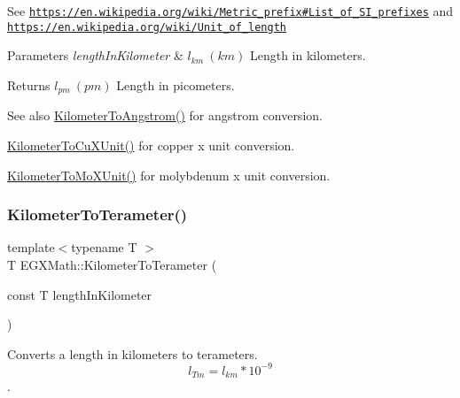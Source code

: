See \href{https://en.wikipedia.org/wiki/Metric_prefix#List_of_SI_prefixes}{\tt https\+://en.\+wikipedia.\+org/wiki/\+Metric\+\_\+prefix\#\+List\+\_\+of\+\_\+\+S\+I\+\_\+prefixes} and \href{https://en.wikipedia.org/wiki/Unit_of_length}{\tt https\+://en.\+wikipedia.\+org/wiki/\+Unit\+\_\+of\+\_\+length} 
\begin{DoxyParams}{Parameters}
{\em length\+In\+Kilometer} & $ l_{km}\ (km)$ Length in kilometers. \\
\hline
\end{DoxyParams}
\begin{DoxyReturn}{Returns}
$ l_{pm}\ (pm)$ Length in picometers. 
\end{DoxyReturn}
\begin{DoxySeeAlso}{See also}
\mbox{\hyperlink{group___e_g_x_math-_conversions-_length_conversions-_kilometer-_non-_s_i_ga415a412a1b03916d6071a206a3318035}{Kilometer\+To\+Angstrom()}} for angstrom conversion. 

\mbox{\hyperlink{group___e_g_x_math-_conversions-_length_conversions-_kilometer-_non-_s_i_ga0614eb6a9e8bf1a9ba6cf51121f22083}{Kilometer\+To\+Cu\+X\+Unit()}} for copper x unit conversion. 

\mbox{\hyperlink{group___e_g_x_math-_conversions-_length_conversions-_kilometer-_non-_s_i_ga547782594ebd0cc3e565f6d32f9528df}{Kilometer\+To\+Mo\+X\+Unit()}} for molybdenum x unit conversion. 
\end{DoxySeeAlso}
\mbox{\label{group___e_g_x_math-_conversions-_length_conversions-_kilometer-_s_i_gadc147bd94e976f0577e7ca544ed81bf9}} 
\subsubsection{\texorpdfstring{Kilometer\+To\+Terameter()}{KilometerToTerameter()}}
{\footnotesize\ttfamily template$<$typename T $>$ \\
T E\+G\+X\+Math\+::\+Kilometer\+To\+Terameter (\begin{DoxyParamCaption}\item[{const T}]{length\+In\+Kilometer }\end{DoxyParamCaption})}



Converts a length in kilometers to terameters. \[ l_{Tm}=l_{km} * 10^{-9} \]. 

